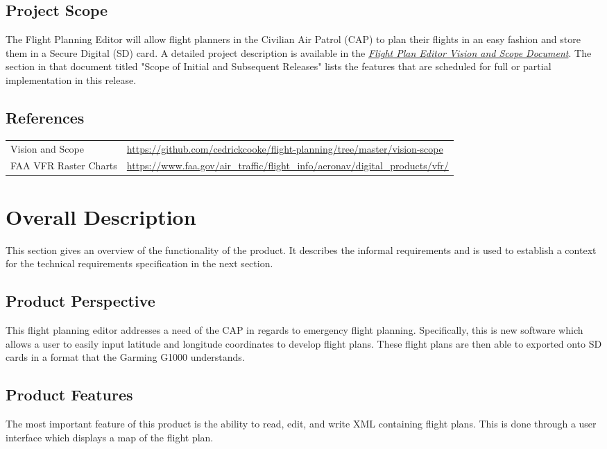 \documentclass[12pt, letterpaper]{article}
\begin{document}
  \subsection{Project Scope}
  The Flight Planning Editor will allow flight planners in the Civilian Air Patrol (CAP)
  to plan their flights in an easy fashion and store them in a Secure Digital (SD) card.
  A detailed project description is available in the \hyperref[sec:ref]{\textit{Flight Plan Editor Vision and Scope Document}}.
  The section in that document titled "Scope of Initial and Subsequent Releases" lists the features that are
  scheduled for full or partial implementation in this release.
  \subsection{References}\label{sec:ref}
  \begin{tabularx}{\textwidth}{l|X}
    \hline
    Vision and Scope & \url{https://github.com/cedrickcooke/flight-planning/tree/master/vision-scope}\\
    FAA VFR Raster Charts & \url{https://www.faa.gov/air_traffic/flight_info/aeronav/digital_products/vfr/} \\
    \hline
  \end{tabularx}

\section{Overall Description}
  This section gives an overview of the functionality of the product.
  It describes the informal requirements and is used to establish a context for the technical
  requirements specification in the next section.
  \subsection{Product Perspective}
    This flight planning editor addresses a need of the CAP in regards to emergency flight planning.
    Specifically, this is new software which allows a user to easily input latitude and longitude coordinates to develop flight plans.
    These flight plans are then able to exported onto SD cards in a format that the Garming G1000 understands.
  \subsection{Product Features}
    The most important feature of this product is the ability to read, edit, and write XML containing flight plans.
    This is done through a user interface which displays a map of the flight plan.
\end{document}
